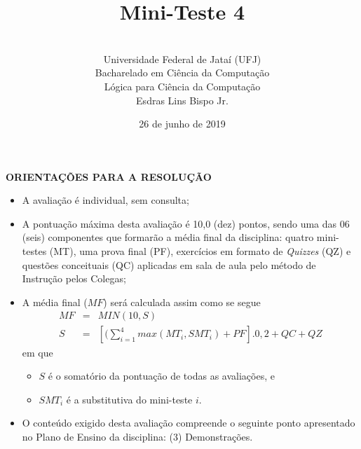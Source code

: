 \documentclass[12pt,a4paper,oneside]{article}
\author{\\Universidade Federal de Jataí (UFJ)\\Bacharelado em Ciência da Computação \\Lógica para Ciência da Computação \\Esdras Lins Bispo Jr.}
\date{26 de junho de 2019}
\title{\sc \huge Mini-Teste 4}
\begin{document}
\maketitle

{\bf ORIENTAÇÕES PARA A RESOLUÇÃO}

\small
 
\begin{itemize}
	\item A avaliação é individual, sem consulta;
	\item A pontuação máxima desta avaliação é 10,0 (dez) pontos, sendo uma das 06 (seis) componentes que formarão a média final da disciplina: quatro mini-testes (MT), uma prova final (PF), exercícios em formato de {\it Quizzes} (QZ) e questões conceituais (QC) aplicadas em sala de aula pelo método de Instrução pelos Colegas;
	\item A média final ($MF$) será calculada assim como se segue
	\begin{eqnarray}
		MF & = & MIN(10, S) \nonumber \\
		S & = & [(\sum_{i=1}^{4} max(MT_i, SMT_i ) + PF].0,2  + QC + QZ\nonumber
	\end{eqnarray}
	em que 
	\begin{itemize}
		\item $S$ é o somatório da pontuação de todas as avaliações, e
		\item $SMT_i$ é a substitutiva do mini-teste $i$.
	\end{itemize}
	\item O conteúdo exigido desta avaliação compreende o seguinte ponto apresentado no Plano de Ensino da disciplina: (3) Demonstrações.
\end{itemize}

\begin{center}
\end{center}

\newpage
\end{document}
